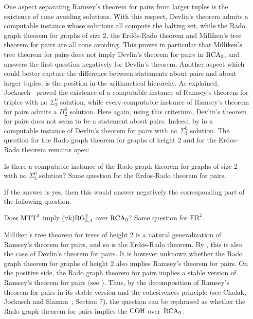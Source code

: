 One aspect separating Ramsey's theorem for pairs from larger tuples is the existence of cone avoiding solutions. With this respect, Devlin's theorem admits a computable instance whose solutions all compute the halting set, while the Rado graph theorem for graphs of size 2, the Erd\"os-Rado theorem and Milliken's tree theorem for pairs are all cone avoiding. This proves in particular that Milliken's tree theorem for pairs does not imply Devlin's theorem for pairs in $\mathrm{RCA}_0$, and answers the first question negatively for Devlin's theorem. Another aspect which could better capture the difference between statements about pairs and about larger tuples, is the position in the arithmetical hierarchy. As explained, Jockusch~\cite{Jockusch1972Ramseys} proved the existence of a computable instance of Ramsey's theorem for triples with no $\Sigma^0_3$ solution, while every computable instance of Ramsey's theorem for pairs admits a $\Pi^0_2$ solution. Here again, using this criterium, Devlin's theorem for pairs does not seem to be a statement about pairs. Indeed, by  in a computable instance of Devlin's theorem for pairs with no $\Sigma^0_3$ solution. The question for the Rado graph theorem for graphs of height 2 and for the Erdos-Rado theorem remains open:

\begin{question}
Is there a computable instance of the Rado graph theorem for graphs of size 2 with no $\Sigma^0_3$ solution? Same question for the Erd\"os-Rado theorem for pairs.
\end{question}

If the answer is yes, then this would answer negatively the corresponding part of the following question.

\begin{question}
  Does $\mathrm{MTT}^{2}_{}$ imply $(\forall k)\mathrm{RG}^2_{k, 4}$ over $\mathrm{RCA}_0$? Same question for $\mathrm{ER}^2$.
\end{question}

Milliken's tree theorem for trees of height 2 is a natural generalization of Ramsey's theorem for pairs, and so is the Erd\"os-Rado theorem. By , this is also the case of Devlin's theorem for pairs. It is however unknown whether the Rado graph theorem for graphs of height 2 also implies Ramsey's theorem for pairs. On the positive side, the Rado graph theorem for pairs implies a stable version of Ramsey's theorem for pairs (see ). Thus, by the decomposition of Ramsey's theorem for pairs in its stable version and the cohesiveness principle (see Cholak, Jockusch and Slaman~\cite{Cholak2001strength}, Section 7), the question can be rephrased as whether the Rado graph theorem for pairs implies the $\mathrm{COH}$ over~$\mathrm{RCA}_0$.


